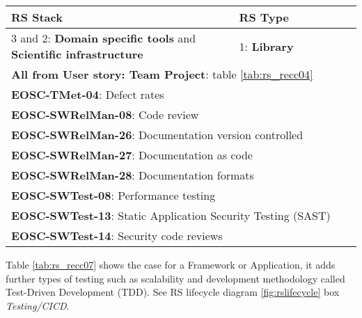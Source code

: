 \begin{center}
  \label{tab:rs_recc06}
  \small
  \begin{tabular}{|p{0.65\linewidth}|p{0.35\linewidth}|} \hline

    \textbf{RS Stack} & \textbf{RS Type} \\ \hline \hline
    3 and 2: \textbf{Domain specific tools} and  \textbf{Scientific infrastructure} &
    1: \textbf{Library} \\ \hline \hline
    \multicolumn{2}{|l|}{\textbf{All from User story: Team Project}: table \ref{tab:rs_recc04}} \\ \hline
    \multicolumn{2}{|l|}{\textbf{EOSC-TMet-04}: Defect rates} \\ \hline
    \multicolumn{2}{|l|}{\textbf{EOSC-SWRelMan-08}: Code review} \\ \hline
    \multicolumn{2}{|l|}{\textbf{EOSC-SWRelMan-26}: Documentation version controlled} \\ \hline
    \multicolumn{2}{|l|}{\textbf{EOSC-SWRelMan-27}: Documentation as code} \\ \hline
    \multicolumn{2}{|l|}{\textbf{EOSC-SWRelMan-28}: Documentation formats} \\ \hline
    \multicolumn{2}{|l|}{\textbf{EOSC-SWTest-08}: Performance testing} \\ \hline
    \multicolumn{2}{|l|}{\textbf{EOSC-SWTest-13}: Static Application Security Testing (SAST)} \\ \hline
    \multicolumn{2}{|l|}{\textbf{EOSC-SWTest-14}: Security code reviews} \\ \hline

  \end{tabular}
\end{center}

Table \ref{tab:rs_recc07} shows the case for a Framework or Application, it adds further types of testing such as scalability and development methodology called Test-Driven Development (TDD). See RS lifecycle diagram \ref{fig:rslifecycle} box \textit{Testing/CICD}.

